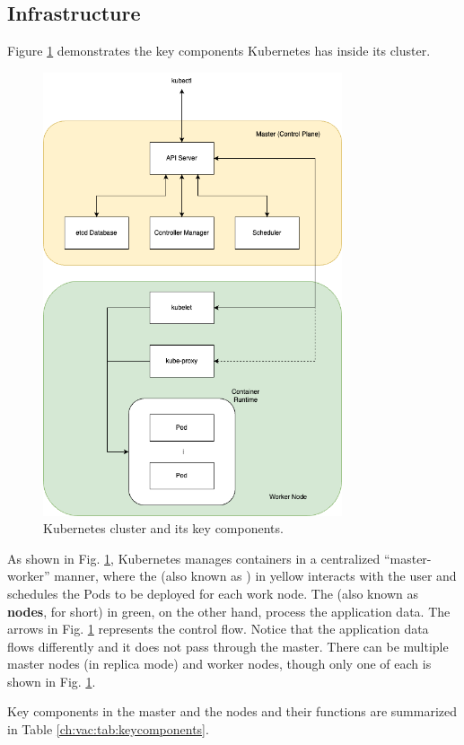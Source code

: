 \subsection{Infrastructure}

Figure \ref{ch:vac:fig:kubernetescluster} demonstrates the key components Kubernetes has inside its cluster.
\begin{figure}[!htb]
	\centering
	\includegraphics[width=250pt]{chapters/part-3/figures/k8sarchitecture.png}
	\caption{Kubernetes cluster and its key components.} \label{ch:vac:fig:kubernetescluster}
\end{figure}
As shown in Fig. \ref{ch:vac:fig:kubernetescluster}, Kubernetes manages containers in a centralized ``master-worker'' manner, where the  (also known as ) in yellow interacts with the user and schedules the Pods to be deployed for each work node. The  (also known as \textbf{nodes}, for short) in green, on the other hand, process the application data. The arrows in Fig. \ref{ch:vac:fig:kubernetescluster} represents the control flow. Notice that the application data flows differently and it does not pass through the master. There can be multiple master nodes (in replica mode) and worker nodes, though only one of each is shown in Fig. \ref{ch:vac:fig:kubernetescluster}.

Key components in the master and the nodes and their functions are summarized in Table \ref{ch:vac:tab:keycomponents}.

